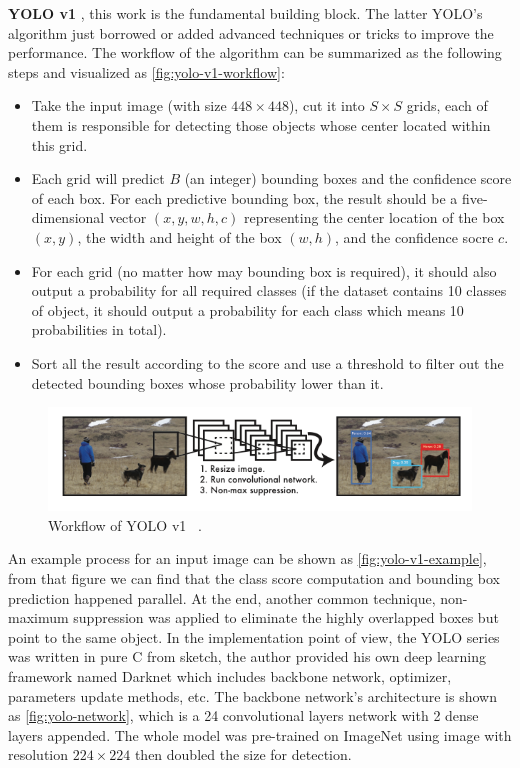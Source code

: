 \textbf{YOLO v1} \cite{yolov1-paper-2015}, this work is the fundamental
building block. The latter YOLO's algorithm
just borrowed or added advanced techniques or tricks to improve the
performance. The workflow of the algorithm can
be summarized as the following steps and visualized as
\autoref{fig:yolo-v1-workflow}:

\begin{itemize}
    \item Take the input image (with size $448 \times 448$), cut it into $S
    \times S$ grids, each of them is responsible for detecting those objects
    whose center located within this grid.

    \item Each grid will predict $B$ (an integer) bounding boxes and the
    confidence score of each box. For each predictive bounding box, the result
    should be a five-dimensional vector $(x, y, w, h, c)$ representing the 
    center location of the box $(x, y)$, the width and height of the box $(w, 
    h)$, and the confidence socre $c$.

    \item For each grid (no matter how may bounding box is required), it should
    also output a probability for all required classes (if the dataset contains
    10 classes of object, it should output a probability for each class which
    means 10 probabilities in total).

    \item Sort all the result according to the score and use a threshold to 
    filter out the detected bounding boxes whose probability lower than it.
\end{itemize}

\begin{figure}
    \includegraphics[width=\linewidth]{figures/yolo_v1_workflow.png}
    \caption{Workflow of YOLO v1 ~\protect\cite{yolov1-paper-2015}.}
    \label{fig:yolo-v1-workflow}
\end{figure}

An example process for an input image can be shown as
\autoref{fig:yolo-v1-example}, from that figure we can find that the
class score computation and bounding box prediction happened parallel. At
the end, another common technique, non-maximum
suppression \cite{non-maximum-suppression-paper} was applied to eliminate the
highly overlapped boxes but point to the same object.
In the implementation point of view, the YOLO series was written in pure C from
sketch, the author provided his own deep learning framework
named Darknet \cite{darknet13} which includes
backbone network, optimizer, parameters update
methods, etc. The backbone network's architecture is shown as
\autoref{fig:yolo-network}, which is a 24 convolutional layers network
with 2 dense layers appended. The whole model was pre-trained on ImageNet
using image with resolution $224 \times 224$ then doubled the size for
detection.



